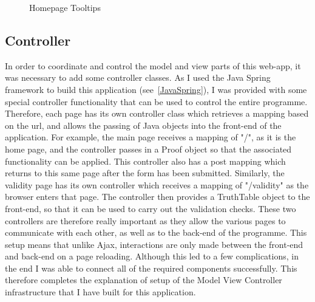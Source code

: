 \begin{figure}[!ht]
	\centering
	\caption{Homepage Tooltips}
\end{figure}

\subsection{Controller}

In order to coordinate and control the model and view parts of this web-app, it was necessary to add some controller classes. As I used the Java Spring framework to build this application (see~\ref{JavaSpring}), I was provided with some special controller functionality that can be used to control the entire programme. Therefore, each page has its own controller class which retrieves a mapping based on the url, and allows the passing of Java objects into the front-end of the application. For example, the main page receives a mapping of "/", as it is the home page, and the controller passes in a Proof object so that the associated functionality can be applied. This controller also has a post mapping which returns to this same page after the form has been submitted. Similarly, the validity page has its own controller which receives a mapping of "/validity" as the browser enters that page. The controller then provides a TruthTable object to the front-end, so that it can be used to carry out the validation checks. These two controllers are therefore really important as they allow the various pages to communicate with each other, as well as to the back-end of the programme. This setup means that unlike Ajax, interactions are only made between the front-end and back-end on a page reloading. Although this led to a few complications, in the end I was able to connect all of the required components successfully. This therefore completes the explanation of setup of the Model View Controller infrastructure that I have built for this application.


